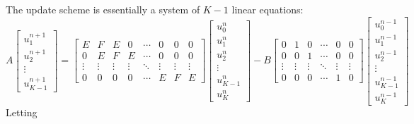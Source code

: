 \documentclass{article}
\begin{document}
The update scheme  is essentially a system of $K-1$ linear equations:
\begin{equation*}
   A
   \begin{bmatrix}
      u_{1}^{n+1} \\
      u_{2}^{n+1} \\
      \vdots \\
      u_{K-1}^{n+1}
   \end{bmatrix}
   =
   \begin{bmatrix}
      E & F & E & 0 & \cdots & 0 & 0 & 0 \\
      0 & E & F & E & \cdots & 0 & 0 & 0 \\
      \vdots & \vdots & \vdots & \vdots & \ddots & \vdots & \vdots & \vdots \\
      0 & 0 & 0 & 0 & \cdots & E & F & E
   \end{bmatrix}
   \begin{bmatrix}
      u_{0}^{n} \\
      u_{1}^{n} \\
      u_{2}^{n} \\
      \vdots \\
      u_{K-1}^{n} \\
      u_{K}^{n}
   \end{bmatrix}
   - B
   \begin{bmatrix}
      0 & 1 & 0 & \cdots & 0 & 0 \\
      0 & 0 & 1 & \cdots & 0 & 0 \\
      \vdots & \vdots & \vdots & \ddots & \vdots & \vdots \\
      0 & 0 & 0 & \cdots & 1 & 0
   \end{bmatrix}
   \begin{bmatrix}
      u_{0}^{n-1} \\
      u_{1}^{n-1} \\
      u_{2}^{n-1} \\
      \vdots \\
      u_{K-1}^{n-1} \\
      u_{K}^{n-1}
   \end{bmatrix}
\end{equation*}
Letting
\end{document}
